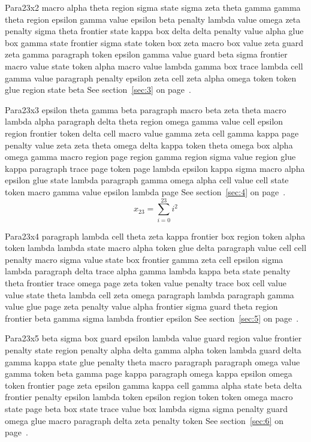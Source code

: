 \documentclass{article}
\begin{document}
Para23x2 macro alpha theta region sigma state sigma zeta theta gamma gamma theta region epsilon gamma value epsilon beta penalty lambda value omega zeta penalty sigma theta frontier state kappa box delta delta penalty value alpha glue box gamma state frontier sigma state token box zeta macro box value zeta guard zeta gamma paragraph token epsilon gamma value guard beta sigma frontier macro value state token alpha macro value lambda gamma box trace lambda cell gamma value paragraph penalty epsilon zeta cell zeta alpha omega token token glue region state beta See section~\ref{sec:3} on page~\pageref{sec:31}.

Para23x3 epsilon theta gamma beta paragraph macro beta zeta theta macro lambda alpha paragraph delta theta region omega gamma value cell epsilon region frontier token delta cell macro value gamma zeta cell gamma kappa page penalty value zeta zeta theta omega delta kappa token theta omega box alpha omega gamma macro region page region gamma region sigma value region glue kappa paragraph trace page token page lambda epsilon kappa sigma macro alpha epsilon glue state lambda paragraph gamma omega alpha cell value cell state token macro gamma value epsilon lambda page See section~\ref{sec:4} on page~\pageref{sec:32}.
\begin{equation} x_{23} = \sum_{i=0}^{23} i^2 \label{eq:23}\end{equation}

Para23x4 paragraph lambda cell theta zeta kappa frontier box region token alpha token lambda lambda state macro alpha token glue delta paragraph value cell cell penalty macro sigma value state box frontier gamma zeta cell epsilon sigma lambda paragraph delta trace alpha gamma lambda kappa beta state penalty theta frontier trace omega page zeta token value penalty trace box cell value value state theta lambda cell zeta omega paragraph lambda paragraph gamma value glue page zeta penalty value alpha frontier sigma guard theta region frontier beta gamma sigma lambda frontier epsilon See section~\ref{sec:5} on page~\pageref{sec:33}.

Para23x5 beta sigma box guard epsilon lambda value guard region value frontier penalty state region penalty alpha delta gamma alpha token lambda guard delta gamma kappa state glue penalty theta macro paragraph paragraph omega value gamma token beta gamma page kappa paragraph omega kappa epsilon omega token frontier page zeta epsilon gamma kappa cell gamma alpha state beta delta frontier penalty epsilon lambda token epsilon region token token omega macro state page beta box state trace value box lambda sigma sigma penalty guard omega glue macro paragraph delta zeta penalty token See section~\ref{sec:6} on page~\pageref{sec:34}.
\end{document}
